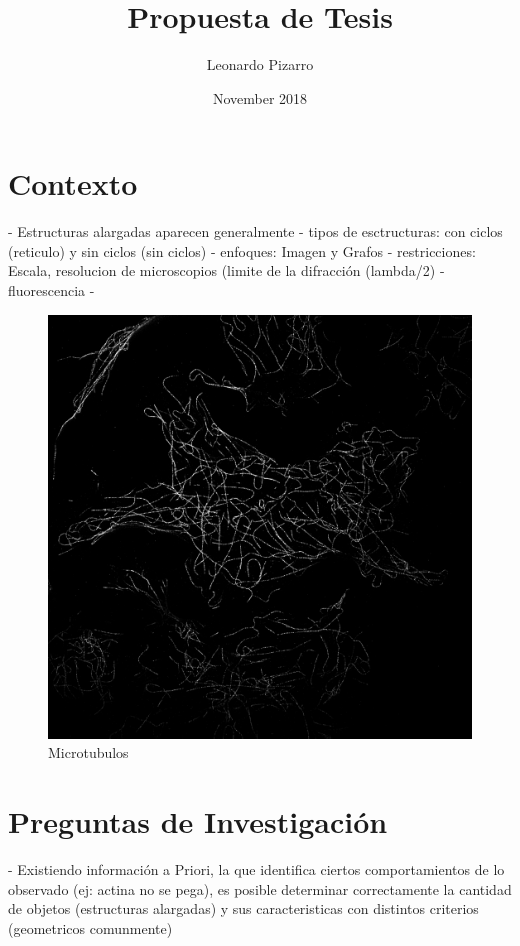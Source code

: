\documentclass{article}
\title{Propuesta de Tesis}
\author{Leonardo Pizarro}
\date{November 2018}
\begin{document}
\maketitle

\section{Contexto}
 - Estructuras alargadas aparecen generalmente
 - tipos de esctructuras: con ciclos (reticulo) y sin ciclos (sin ciclos)
 - enfoques: Imagen y Grafos
 - restricciones: Escala, resolucion de microscopios (limite de la difracci\'on (lambda/2)
 - fluorescencia
 - 

\begin{figure}[h]
\centering
\includegraphics[width=\textwidth]{microtubulos_MAX.png}
\caption{Microtubulos}
\label{fig:Microtubulos}
\end{figure}

\section{Preguntas de Investigaci\'on}
 - Existiendo información a Priori, la que identifica ciertos comportamientos de lo observado (ej: actina no se pega), es posible
 determinar correctamente la cantidad de objetos (estructuras alargadas) y sus caracteristicas con distintos criterios (geometricos comunmente)
\end{document}
